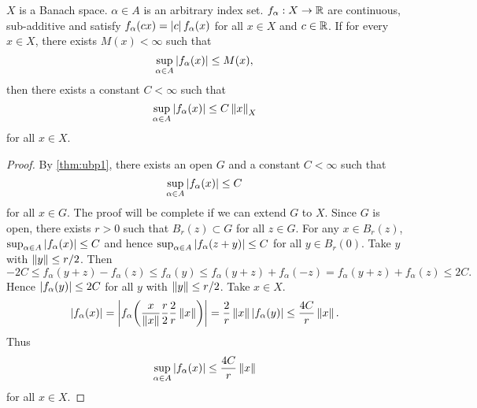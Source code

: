 \begin{theorem}\label{thm:ubp2}
    $X$ is a Banach space. $\alpha\in A$ is an arbitrary index set. 
    $f_\alpha:X\to\mathbb{R}$ are continuous, sub-additive and satisfy 
    $f_\alpha(cx) = \left\lvert {c} \right\rvert f_\alpha(x)$ for all $x\in X$ and $c\in\mathbb{R}$. 
    If for every $x\in X$, there exists $M(x)<\infty$ such that 
    \begin{equation*}
        \sup_{\alpha\in A}\left\lvert {f_\alpha(x)} \right\rvert\leq M(x),
    \end{equation*}
    then there exists a constant $C<\infty$ such that
    \begin{equation*}
        \sup_{\alpha\in A}\left\lvert {f_\alpha(x)} \right\rvert\leq C\left\lVert {x} \right\rVert_X
    \end{equation*}
    for all $x\in X$.
\end{theorem}
\begin{proof}
    By \cref{thm:ubp1}, there exists an open $G$ and a constant 
    $C<\infty$ such that 
    \begin{equation*}
        \sup_{\alpha\in A}\left\lvert {f_\alpha(x)} \right\rvert\leq C
    \end{equation*}
    for all $x\in G$. The proof will be complete if we can 
    extend $G$ to $X$. Since $G$ is open, there exists $r>0$ 
    such that $B_r(z)\subset G$ for all $z\in G$. For any 
    $x\in B_r(z)$, $\sup_{\alpha\in A} \left\lvert {f_\alpha(x)} \right\rvert
    \leq C$ and hence $\sup_{\alpha\in A} \left\lvert {f_\alpha(z+y)} \right\rvert 
    \leq C$ for all $y\in B_r(0)$. Take $y$ with $\left\lVert {y} \right\rVert
    \leq r/2$. Then 
    \begin{equation*}
        -2C \leq f_\alpha(y+z) - f_\alpha(z) \leq f_\alpha(y) 
        \leq f_\alpha(y+z) + f_\alpha(-z) 
        = f_\alpha(y+z) + f_\alpha(z) \leq 2C.
    \end{equation*}
    Hence $\left\lvert {f_\alpha(y)} \right\rvert\leq 2C$ for all $y$ with $\left\lVert {y} \right\rVert
    \leq r/2$. Take $x\in X$. 
    \begin{equation*}
        \abs{f_\alpha(x)} 
        = \abs{f_\alpha\pth{\frac{x}{\norm{x}}\frac{r}{2}\frac{2}{r}\norm{x}}} 
        = \frac{2}{r}\norm{x}\abs{f_\alpha(y)} \leq \frac{4C}{r}\norm{x}.
    \end{equation*}
    Thus 
    \begin{equation*}
        \sup_{\alpha\in A}\left\lvert {f_\alpha(x)} \right\rvert\leq \frac{4C}{r}\left\lVert {x} \right\rVert
    \end{equation*}
    for all $x\in X$.
\end{proof}

